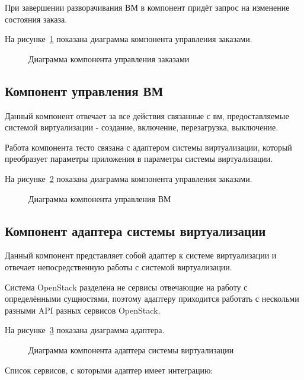 При завершении разворачивания ВМ в компонент придёт запрос на изменение состояния заказа.

На рисунке~\ref{fig:order_control_scheme} показана диаграмма компонента управления заказами.
\begin{figure}[ht]
  \caption{Диаграмма компонента управления заказами}\label{fig:order_control_scheme}
\end{figure}

\subsection{Компонент управления ВМ}\label{sec:subs2}
Данный компонент отвечает за все действия связанные с вм, предоставляемые системой виртуализации - создание, включение, перезагрузка, выключение.

Работа компонента тесто связана с адаптером системы виртуализации, который преобразует параметры приложения в параметры системы виртуализации.

На рисунке~\ref{fig:vm_control_scheme} показана диаграмма компонента управления заказами.
\begin{figure}[ht]
  \caption{Диаграмма компонента управления ВМ}\label{fig:vm_control_scheme}
\end{figure}

\subsection{Компонент адаптера системы виртуализации}\label{sec:subs3}
Данный компонент представляет собой адаптер к системе виртуализации и отвечает непосредственную работы с системой виртуализации.

Система OpenStack разделена не сервисы отвечающие на работу с определёнными сущностями, поэтому адаптеру приходится работать с нескольми разными API разных сервисов OpenStack.

На рисунке~\ref{fig:virt_adapter_scheme} показана диаграмма адаптера.
\begin{figure}[ht]
  \caption{Диаграмма компонента адаптера системы виртуализации}\label{fig:virt_adapter_scheme}
\end{figure}

Список сервисов, с которыми адаптер имеет интеграцию:

